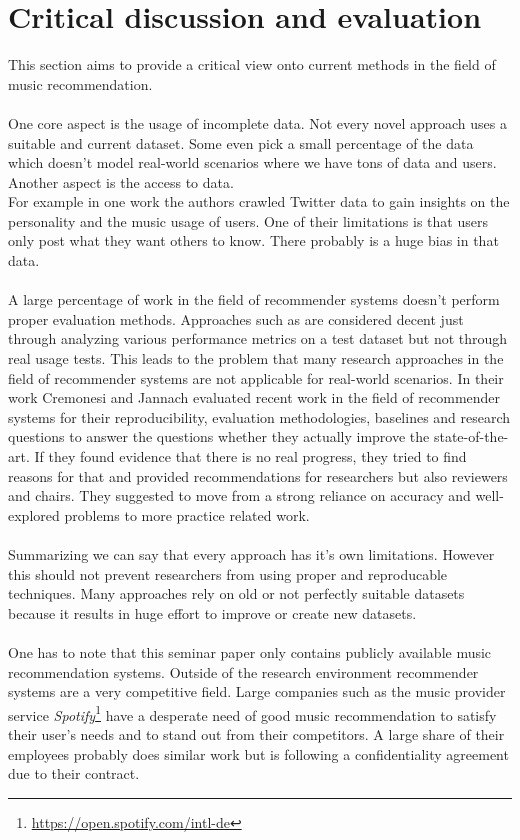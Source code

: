 \documentclass[runningheads,a4paper]{llncs}
\begin{document}
\section{Critical discussion and evaluation}
This section aims to provide a critical view onto current methods in the field of music recommendation. \\
\\
One core aspect is the usage of incomplete data. Not every novel approach uses a suitable and current dataset.
Some even pick a small percentage of the data which doesn't model real-world scenarios where we have tons of data and users.
Another aspect is the access to data. \\
For example in one work  \cite{melchiorre2020personality}  the authors crawled Twitter data
 to gain insights on the personality and the music usage of users. 
One of their limitations is that users only post what they want others to know. There probably is a huge bias in that data. \\
\\
A large percentage of work in the field of recommender systems doesn't perform proper evaluation methods. 
Approaches such as \cite{niyazov2021content} are considered decent just through analyzing various performance metrics on a test dataset but not 
through real usage tests. This leads to the problem that many research approaches in the field of recommender systems are 
not applicable for real-world scenarios. 
In their work Cremonesi and Jannach evaluated recent work in the field of recommender systems for their reproducibility, 
evaluation methodologies, baselines and research questions to answer the questions whether they actually improve the state-of-the-art.
If they found evidence that there is no real progress, they tried to find reasons for that and provided recommendations for researchers 
but also reviewers and chairs. 
They suggested to move from a strong reliance on accuracy and well-explored problems to more practice related work. \cite{cremonesi2021progress} \\
\\
Summarizing we can say that every approach has it's own limitations. However this should not prevent researchers from using proper and reproducable techniques. 
Many approaches rely on old or not perfectly suitable datasets because 
it results in huge effort to improve or create new datasets. \\
\\
One has to note that this seminar paper only contains publicly available music recommendation systems.
Outside of the research environment recommender systems are a very competitive field. 
Large companies such as the music provider service \textit{Spotify}\footnote{\url{https://open.spotify.com/intl-de}}
have a desperate need of good music recommendation to satisfy their user's needs and to stand out from their competitors. 
A large share of their employees probably does similar work but 
is following a confidentiality agreement due to their contract.\\
\end{document}

